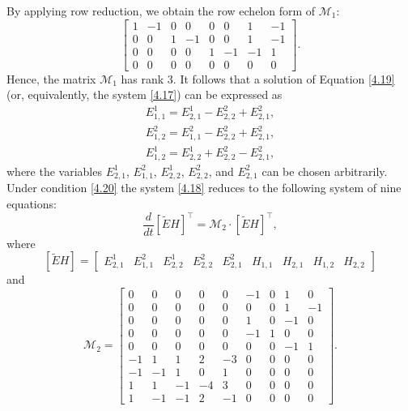 \documentclass[english]{article}
\theoremstyle{plain}
\theoremstyle{definition}
\theoremstyle{remark}
\numberwithin{equation}{section}
\begin{document}
By applying row reduction, we obtain the row echelon form of $\mathcal{M}_1$:
\begin{equation*}
\begin{bmatrix}
1 & -1 & 0 & 0 & 0 & 0 & 1 & -1 \\
0 & 0 & 1 & -1 & 0 & 0 & 1 & -1\\
0 & 0 & 0 & 0 & 1 & -1 & -1 & 1\\
0 & 0 & 0 & 0 & 0 & 0 & 0 & 0
\end{bmatrix}.
\end{equation*}
Hence, the matrix $\mathcal{M}_1$ has rank 3. It follows that a solution of Equation  \eqref{4.19} (or, equivalently, the system \eqref{4.17}) can be expressed as
\begin{align}\label{4.20}
E^1_{1,1}=E^1_{2,1}-E^2_{2,2}+E^2_{2,1}, \nonumber \\
 E^2_{1,2}=E^2_{1,1}-E^2_{2,2}+E^2_{2,1}, \nonumber \\
 E^1_{1,2}=E^1_{2,2}+E^2_{2,2}-E^2_{2,1},
\end{align}
where the variables $E^1_{2,1}$, $E^2_{1,1}$, $E^1_{2,2}$, $E^2_{2,2}$, and $E^2_{2,1}$ can be chosen arbitrarily.
Under condition \eqref{4.20} the system  \eqref{4.18} reduces to the following system of nine equations:
\begin{equation}\label{4.21}
\frac{d}{dt}[\tilde{E}H]^\top=\mathcal{M}_2\cdot[\tilde{E}H]^\top,
 \end{equation}
where
\begin{equation*}\label{}
 [\tilde{E}H]=
 \begin{bmatrix}
E^1_{2,1} & E^2_{1,1} & E^1_{2,2} & E^2_{2,2} & E^2_{2,1} & H_{1,1} & H_{2,1} & H_{1,2} & H_{2,2}
 \end{bmatrix}
\end{equation*}
and
\begin{equation*}
 \mathcal{M}_2=
\begin{bmatrix}
0 & 0 & 0 & 0 & 0 & -1 & 0 & 1 & 0 \\
0 & 0 & 0 & 0 & 0 & 0 & 0 & 1 & -1 \\
0 & 0 & 0 & 0 & 0 & 1 & 0 & -1 & 0 \\
0 & 0 & 0 & 0 & 0 & -1 & 1 & 0 & 0 \\
0 & 0 & 0 & 0 & 0 & 0 & 0 & -1 & 1 \\
-1 & 1 & 1 & 2 & -3 & 0 & 0 & 0 & 0 \\
-1 & -1 & 1 & 0 & 1 & 0 & 0 & 0 & 0 \\
1 & 1 & -1 & -4 & 3 & 0 & 0 & 0 & 0 \\
1 & -1 & -1 & 2 & -1 & 0 & 0 & 0 & 0
\end{bmatrix}.
\end{equation*}
\end{document}
